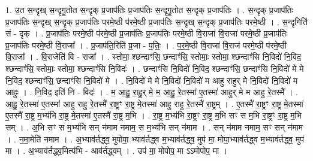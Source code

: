 \documentclass[17pt]{extarticle}
\begin{document}
1. उ॒त स॒न्दृख् स॒न्दृगु॒तोत स॒न्दृक् प्र॒जाप॑तिः प्र॒जाप॑तिः स॒न्दृगु॒तोत स॒न्दृक् प्र॒जाप॑तिः । . स॒न्दृक् प्र॒जाप॑तिः प्र॒जाप॑तिः स॒न्दृख् स॒न्दृक् प्र॒जाप॑तिः परमे॒ष्ठी प॑रमे॒ष्ठी प्र॒जाप॑तिः स॒न्दृख् स॒न्दृक् प्र॒जाप॑तिः परमे॒ष्ठी । . स॒न्दृगिति॑ सं - दृक् । . प्र॒जाप॑तिः परमे॒ष्ठी प॑रमे॒ष्ठी प्र॒जाप॑तिः प्र॒जाप॑तिः परमे॒ष्ठी वि॒राजा॑ वि॒राजा॑ परमे॒ष्ठी प्र॒जाप॑तिः प्र॒जाप॑तिः परमे॒ष्ठी वि॒राजा᳚ । . प्र॒जाप॑ति॒रिति॑ प्र॒जा - प॒तिः॒ । . प॒र॒मे॒ष्ठी वि॒राजा॑ वि॒राज॑ परमे॒ष्ठी प॑रमे॒ष्ठी वि॒राजा᳚ । . वि॒राजेति॑ वि - राजा᳚ । . स्तोमा॒ श्छन्दाꣳ॑सि॒ छन्दाꣳ॑सि॒ स्तोमाः॒ स्तोमा॒ श्छन्दाꣳ॑सि नि॒विदो॑ नि॒विद॒ श्छन्दाꣳ॑सि॒ स्तोमाः॒ स्तोमा॒ श्छन्दाꣳ॑सि नि॒विदः॑ । . छन्दाꣳ॑सि नि॒विदो॑ नि॒विद॒ श्छन्दाꣳ॑सि॒ छन्दाꣳ॑सि नि॒विदो॑ मे मे नि॒विद॒ श्छन्दाꣳ॑सि॒ छन्दाꣳ॑सि नि॒विदो॑ मे । . नि॒विदो॑ मे मे नि॒विदो॑ नि॒विदो॑ म आहु राहुर् मे नि॒विदो॑ नि॒विदो॑ म आहुः । . नि॒विद॒ इति॑ नि - विदः॑ । . म॒ आ॒हु॒ रा॒हु॒र् मे॒ म॒ आ॒हु॒ रे॒तस्मा॑ ए॒तस्मा॑ आहुर् मे म आहु रे॒तस्मै᳚ । . आ॒हु॒ रे॒तस्मा॑ ए॒तस्मा॑ आहु राहु रे॒तस्मै॑ रा॒ष्ट्रꣳ रा॒ष्ट्र मे॒तस्मा॑ आहु राहु रे॒तस्मै॑ रा॒ष्ट्रम् । . ए॒तस्मै॑ रा॒ष्ट्रꣳ रा॒ष्ट्र मे॒तस्मा॑ ए॒तस्मै॑ रा॒ष्ट्र म॒भ्य॑भि रा॒ष्ट्र मे॒तस्मा॑ ए॒तस्मै॑ रा॒ष्ट्र म॒भि । . रा॒ष्ट्र म॒भ्य॑भि रा॒ष्ट्रꣳ रा॒ष्ट्र म॒भि सꣳ स म॒भि रा॒ष्ट्रꣳ रा॒ष्ट्र म॒भि सम् । . अ॒भि सꣳ स म॒भ्य॑भि सन् न॑माम नमाम॒ स म॒भ्य॑भि सन् न॑माम । . सन् न॑माम नमाम॒ सꣳ सन् न॑माम । . न॒मा॒मेति॑ नमाम । . अ॒भ्याव॑र्तद्ध्व॒ मुपोपा॒ भ्याव॑र्तद्ध्व म॒भ्याव॑र्तद्ध्व॒ मुप॑ मा॒ मोपा॒भ्याव॑र्तद्ध्व म॒भ्याव॑र्तद्ध्व॒ मुप॑ मा । . अ॒भ्याव॑र्तद्ध्व॒मित्य॑भि - आव॑र्तद्ध्वम् । . उप॑ मा॒ मोपोप॒ मा ऽऽमोपोप॒ मा । \newline
\end{document}
